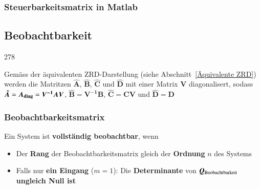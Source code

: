 \subsubsection*{Steuerbarkeitsmatrix in Matlab}




\subsection{Beobachtbarkeit}{278}

Gemäss der äquivalenten ZRD-Darstellung (siehe Abschnitt~\ref{Äquivalente ZRD}) werden die Matritzen $\bm{\hat{A}}$,
$\bm{\hat{B}}$, $\bm{\hat{C}}$ und $\bm{\hat{D}}$ mit einer Matrix $\bm{V}$ diagonalisert, sodass 
$\bm{\hat{A}} = \bm{A_{\rm diag}} = \bm{V^{-1} A V}$, $\bm{\hat{B}} = \bm{V^{-1} B}$, 
$\bm{\hat{C}} = \bm{C V}$ und $\bm{\hat{D}} = \bm{D}$

\vspace{0.2cm}

\vspace{0.2cm}



\subsubsection{Beobachtbarkeitsmatrix}

Ein System ist \textbf{vollständig beobachtbar}, wenn
\begin{itemize}
    \item Der \textbf{Rang} der Beobachtbarkeitsmatrix gleich der \textbf{Ordnung} $n$ des Systems
    \item Falls nur \textbf{ein Eingang} ($m = 1$): Die \textbf{Determinante} von $\bm{Q}_{\rm Beobachtbarkeit}$ 
        \textbf{ungleich Null ist}
\end{itemize}

